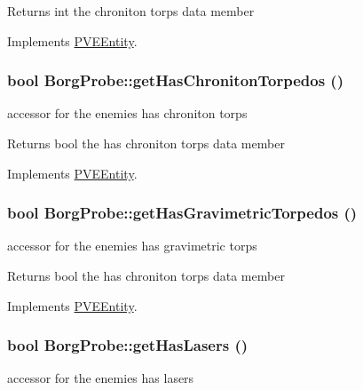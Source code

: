 \begin{DoxyReturn}{Returns}
int the chroniton torps data member 
\end{DoxyReturn}


Implements \hyperlink{classPVEEntity}{PVEEntity}.

\hypertarget{classBorgProbe_a6edb033d9ace089d17c1495447e76b1d}{
\subsubsection[{getHasChronitonTorpedos}]{\setlength{\rightskip}{0pt plus 5cm}bool BorgProbe::getHasChronitonTorpedos ()}}
\label{db/deb/classBorgProbe_a6edb033d9ace089d17c1495447e76b1d}
accessor for the enemies has chroniton torps

\begin{DoxyReturn}{Returns}
bool the has chroniton torps data member 
\end{DoxyReturn}


Implements \hyperlink{classPVEEntity}{PVEEntity}.

\hypertarget{classBorgProbe_a882991a84e51a0fd78de0320d4bec53a}{
\subsubsection[{getHasGravimetricTorpedos}]{\setlength{\rightskip}{0pt plus 5cm}bool BorgProbe::getHasGravimetricTorpedos ()}}
\label{db/deb/classBorgProbe_a882991a84e51a0fd78de0320d4bec53a}
accessor for the enemies has gravimetric torps

\begin{DoxyReturn}{Returns}
bool the has chroniton torps data member 
\end{DoxyReturn}


Implements \hyperlink{classPVEEntity}{PVEEntity}.

\hypertarget{classBorgProbe_a1a77fe640dd80aa9dd6ceb3b8e9555bf}{
\subsubsection[{getHasLasers}]{\setlength{\rightskip}{0pt plus 5cm}bool BorgProbe::getHasLasers ()}}
\label{db/deb/classBorgProbe_a1a77fe640dd80aa9dd6ceb3b8e9555bf}
accessor for the enemies has lasers


